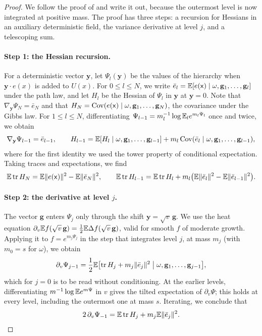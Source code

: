 \begin{proof}
We follow the proof of \cite[Lemma~2.2]{oai-barriers} and write it out, because the outermost level is now integrated at positive mass. The proof has three steps: a recursion for Hessians in an auxiliary deterministic field, the variance derivative at level $j$, and a telescoping sum.

\paragraph{Step 1: the Hessian recursion.} For a deterministic vector $\mathbf y$, let $\Psi_l(\mathbf y)$ be the values of the hierarchy when $\mathbf y\cdot e(x)$ is added to $U(x)$. For $0\le l\le N$, we write $\bar e_l=\mathbb E[e(\mathsf x)\mid\omega,\mathbf g_1,\dots,\mathbf g_l]$ under the path law, and let $H_l$ be the Hessian of $\Psi_l$ in $\mathbf y$ at $\mathbf y=0$. Note that $\nabla_{\mathbf y}\Psi_N=\bar e_N$ and that $H_N=\operatorname{Cov}(e(\mathsf x)\mid\omega,\mathbf g_1,\dots,\mathbf g_N)$, the covariance under the Gibbs law. For $1\le l\le N$, differentiating $\Psi_{l-1}=m_l^{-1}\log\mathbb E_le^{m_l\Psi_l}$ once and twice, we obtain
\[
 \nabla_{\mathbf y}\Psi_{l-1}=\bar e_{l-1},\qquad
 H_{l-1}=\mathbb E[H_l\mid\omega,\mathbf g_1,\dots,\mathbf g_{l-1}]+m_l\operatorname{Cov}(\bar e_l\mid\omega,\mathbf g_1,\dots,\mathbf g_{l-1}),
\]
where for the first identity we used the tower property of conditional expectation. Taking traces and expectations, we find
\begin{equation}\label{eq:fr-hessian-trace}
 \mathbb E\operatorname{tr} H_N=\mathbb E\lVert e(\mathsf x)\rVert^2-\mathbb E\lVert \bar e_N\rVert^2,\qquad
 \mathbb E\operatorname{tr} H_{l-1}=\mathbb E\operatorname{tr} H_l+m_l\bigl(\mathbb E\lVert \bar e_l\rVert^2-\mathbb E\lVert \bar e_{l-1}\rVert^2\bigr).
\end{equation}

\paragraph{Step 2: the derivative at level $j$.} The vector $\mathbf g$ enters $\Psi_j$ only through the shift $\mathbf y=\sqrt v\,\mathbf g$. We use the heat equation $\partial_v\mathbb E f(\sqrt v\,\mathbf g)=\frac12\mathbb E\Delta f(\sqrt v\,\mathbf g)$, valid for smooth $f$ of moderate growth. Applying it to $f=e^{m_j\Psi_j}$ in the step that integrates level $j$, at mass $m_j$ (with $m_0=s$ for $\omega$), we obtain
\[
 \partial_v\Psi_{j-1}=\frac12\mathbb E\bigl[\operatorname{tr} H_j+m_j\lVert \bar e_j\rVert^2\bigm|\omega,\mathbf g_1,\dots,\mathbf g_{j-1}\bigr],
\]
which for $j=0$ is to be read without conditioning. At the earlier levels, differentiating $m^{-1}\log\mathbb E e^{m\Psi}$ in $v$ gives the tilted expectation of $\partial_v\Psi$; this holds at every level, including the outermost one at mass $s$. Iterating, we conclude that
\begin{equation}\label{eq:fr-derivative-step2}
 2\,\partial_v\Psi_{-1}=\mathbb E\operatorname{tr} H_j+m_j\mathbb E\lVert \bar e_j\rVert^2.
\end{equation}


\end{proof}
